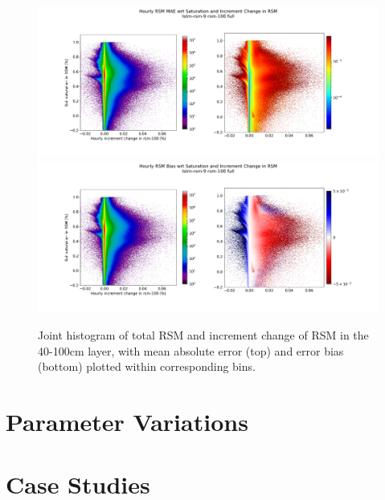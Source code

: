 \begin{figure}[hp!]
    \centering

    \includegraphics[width=.96\linewidth,draft=false]{figures/grid-eval_lstm-rsm-9_full/eval-grid_full_lstm-rsm-9_rsm-100_hist-state-increment_abs-err.png}
    \includegraphics[width=.96\linewidth,draft=false]{figures/grid-eval_lstm-rsm-9_full/eval-grid_full_lstm-rsm-9_rsm-100_hist-state-increment_bias.png}

    \caption{Joint histogram of total RSM and increment change of RSM in the 40-100cm layer, with mean absolute error (top) and error bias (bottom) plotted within corresponding bins.}
    \label{lstm-rsm-9-sihist-rsm-100}
\end{figure}

\section{Parameter Variations}

\section{Case Studies}

